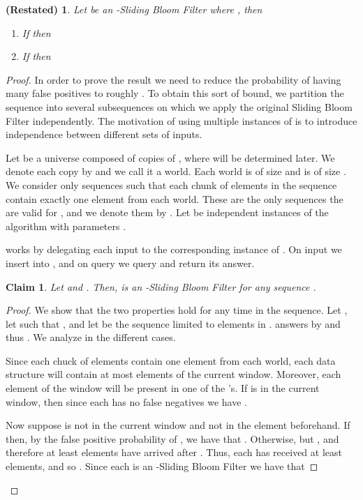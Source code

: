 \documentclass[11pt]{article}
\newtheorem{claim}[theorem]{Claim}
\newtheorem*{thm:LowerBound}{\Cref{LowerBoundNumber} (Restated)}
\begin{document}
\begin{thm:LowerBound}
Let  be an -Sliding Bloom Filter where , then
\begin{enumerate}
\item If  then 
\item If  then 
\end{enumerate}
\end{thm:LowerBound}
\begin{proof}
In order to prove the result we need to reduce the probability of having many false positives to roughly . To obtain this sort of bound, we partition the sequence into several subsequences on which we apply the original Sliding Bloom Filter independently. The motivation of using multiple instances of  is to introduce independence between different sets of inputs.

Let  be a universe composed of  copies of , where  will be determined later. We denote each copy by  and we call it a world. Each world is of size  and  is of size . We consider only sequences such that each chunk of  elements in the sequence contain exactly one element from each world. These are the only sequences the are valid for , and we denote them by . Let  be  independent instances of the algorithm  with parameters .

 works by delegating each input to the corresponding instance of . On input  we insert  into , and on query  we query  and return its answer. 
\begin{claim}
Let  and . Then,  is an -Sliding Bloom Filter for any sequence .
\end{claim}
\begin{proof}
We show that the two properties hold for any time  in the sequence. Let , let  such that , and let  be the sequence  limited to elements in .  answers by  and thus . We analyze  in the different cases.

Since each chuck of  elements contain one element from each world, each data structure will contain at most  elements of the current window. Moreover, each element of the window will be present in one of the 's. If  is in the current window, then since each  has no false negatives we have .

Now suppose  is not in the current window and not in the  element beforehand. If  then, by the false positive probability of , we have that . Otherwise,  but , and therefore at least  elements have arrived after . Thus, each  has received at least  elements, and so . Since each  is an -Sliding Bloom Filter we have that 
\end{proof}


\end{proof}
\end{document}
